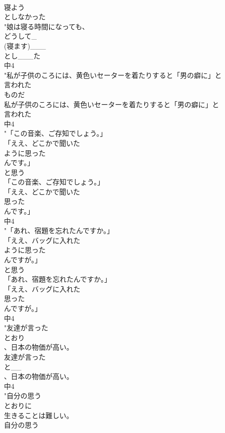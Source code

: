 \documentclass[8pt]{extreport}
\begin{document}
\begin{CJK}{UTF8}{min}
\\	寝よう
\\	としなかった
\\	"娘は寝る時間になっても、
\\	どうして_
\\	(寝ます)___
\\	とし___た
\\	中4
\\	"私が子供のころには、黄色いセーターを着たりすると「男の癖に」と
\\	言われた
\\	ものだ
\\	私が子供のころには、黄色いセーターを着たりすると「男の癖に」と
\\	言われた
\\	中4
\\	"「この音楽、ご存知でしょう。」
\\	「ええ、どこかで聞いた
\\	ように思った
\\	んです。」
\\	と思う 
\\	「この音楽、ご存知でしょう。」
\\	「ええ、どこかで聞いた
\\	思った
\\	んです。」
\\	中4
\\	"「あれ、宿題を忘れたんですか。」
\\	「ええ、バッグに入れた
\\	ように思った
\\	んですが。」
\\	と思う 
\\	「あれ、宿題を忘れたんですか。」
\\	「ええ、バッグに入れた
\\	思った
\\	んですが。」
\\	中4
\\	"友達が言った
\\	とおり
\\	、日本の物価が高い。
\\	友達が言った
\\	と__
\\	、日本の物価が高い。
\\	中4
\\	"自分の思う
\\	とおりに
\\	生きることは難しい。
\\	自分の思う

\end{CJK}
\end{document}
